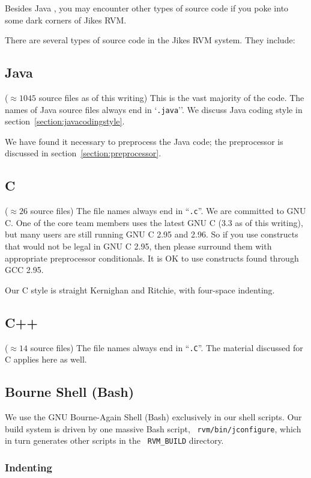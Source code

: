 Besides Java , you may
encounter other types of source code if you poke into some dark
corners of Jikes RVM.  

There are several types of source code in the Jikes RVM system.  They
include:


\subsection{Java} 
($\approx 1045$ source files as of this writing)  This is
the vast majority of the code.  The names of Java source files always end in
`{\tt .java}''.   We discuss Java coding style in
section~\ref{section:javacodingstyle}. 

We have found it necessary to preprocess the Java code; the
preprocessor is discussed in section~\ref{section:preprocessor}.


\subsection {C}

($\approx 26$ source files)  The file names always
end in ``{\tt .c}''.  We are committed to GNU C.  One of the core team
members uses the latest GNU C (3.3 as of this writing), but many users
are still running GNU C 2.95 and 2.96.  So if you use constructs that
would not be legal in GNU C 2.95, then please surround them with
appropriate preprocessor conditionals.  It is OK to use constructs
found through GCC 2.95.

Our C style is straight Kernighan and Ritchie, with four-space
indenting.  

\subsection{C++} 

($\approx 14$ source files)  The file names always end in
``{\tt .C}''.   The material discussed for C applies here as well.

\subsection{Bourne Shell (Bash)}

We use the GNU Bourne-Again Shell (Bash) exclusively in our shell
scripts.  Our build system is driven by one massive Bash script, {\tt
rvm/bin/jconfigure}, which in turn generates other scripts in the {\tt
RVM\_BUILD} directory.

\subsubsection{Indenting}

